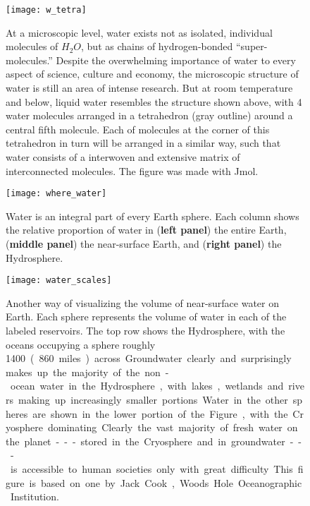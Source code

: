 {\newpage
\begin{figure}[p]
\centering
  \texttt{[image: w\_tetra]}%
\caption{At a microscopic level, water exists not as isolated, individual molecules of $H_2O$, but as chains of hydrogen-bonded ``super-molecules.'' Despite the overwhelming importance of water to every aspect of science, culture and economy, the microscopic structure of water is still an area of intense research. But at room temperature and below, liquid water resembles the structure shown above, with 4 water molecules arranged in a tetrahedron (gray outline) around a central fifth molecule. Each of molecules at the corner of this tetrahedron in turn will be arranged in a similar way, such that water consists of a interwoven and extensive matrix of interconnected molecules. The figure was made with Jmol.}
\label{fig:w_tetra}
\end{figure}


\newpage
\begin{figure}[p]
\centering
  \texttt{[image: where\_water]}%
\caption{Water is an integral part of every Earth sphere. Each column shows the relative proportion of water in (\textbf{left panel}) the entire Earth, (\textbf{middle panel}) the near-surface Earth, and (\textbf{right panel}) the Hydrosphere.}
\label{fig:where_water}
\end{figure}

\newpage
\begin{figure}[p]
\centering
  \texttt{[image: water\_scales]}%
\caption{Another way of visualizing the volume of near-surface water on Earth. Each sphere represents the volume of water in each of the labeled reservoirs. The top row shows the Hydrosphere, with the oceans occupying a sphere roughly \SI{1400}[{\kilo}{\metre}] (860 miles) across. Groundwater clearly and surprisingly makes up the majority of the non-ocean water in the Hydrosphere, with lakes, wetlands and rivers making up increasingly smaller portions. Water in the other spheres are shown in the lower portion of the Figure, with the Cryosphere dominating. Clearly the vast majority of fresh water on the planet---stored in the Cryosphere and in groundwater---is accessible to human societies only with great difficulty. This figure is based on one by Jack Cook, Woods Hole Oceanographic Institution.}
\label{fig:water_scales}
\end{figure}


}
